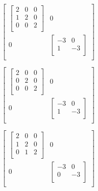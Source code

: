 \documentclass[12pt]{article}
\begin{document}
{\begin{multicols}{3}
      \[
        \begin{bmatrix}
          \begin{bmatrix}
            2 & 0 & 0\\
            1 & 2 & 0 \\
            0 & 0 & 2 \\
          \end{bmatrix} & 0 \\
          0 & \begin{bmatrix}
            -3 & 0 \\
            1 & -3 \\
          \end{bmatrix} \\
        \end{bmatrix}
      \]

      \[
        \begin{bmatrix}
          \begin{bmatrix}
            2 & 0 & 0\\
            0 & 2 & 0 \\
            0 & 0 & 2 \\
          \end{bmatrix} & 0 \\
          0 & \begin{bmatrix}
            -3 & 0 \\
            1 & -3 \\
          \end{bmatrix} \\
        \end{bmatrix}
      \]
    \end{multicols}

    \begin{multicols}{3}
      \[
        \begin{bmatrix}
          \begin{bmatrix}
            2 & 0 & 0\\
            1 & 2 & 0 \\
            0 & 1 & 2 \\
          \end{bmatrix} & 0 \\
          0 & \begin{bmatrix}
            -3 & 0 \\
            0 & -3 \\
          \end{bmatrix} \\
        \end{bmatrix}
      \]


\end{multicols}}
\end{document}
